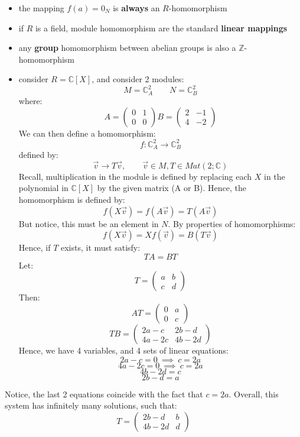 \documentclass{exam}
\begin{document}
\begin{itemize}
    \item the mapping $f(a) = 0_N$ is \textbf{always} an $R$-homomorphism
    \item if $R$ is a field, module homomorphism are the standard \textbf{linear mappings}
    \item any \textbf{group} homomorphism between abelian groups is also a  $\mathbb{Z}$-homomorphism
    \item consider $R = \mathbb{C}[X]$, and consider 2 modules:
    \[
    M = \mathbb{C}_A^2 \qquad N = \mathbb{C}_B^2
    \]
    where:
    \[
    A = \begin{pmatrix}
    0 & 1 \\
    0 & 0
    \end{pmatrix}
    B = \begin{pmatrix}
    2 & -1 \\
    4 & -2
    \end{pmatrix}
    \]
    We can then define a homomorphism:
    \[
    f : \mathbb{C}_A^2 \to \mathbb{C}_B^2
    \]
    defined by:
    \[
    \vec{v} \to T\vec{v}, \qquad \vec{v} \in M, T \in Mat(2;\mathbb{C})
    \]
    Recall, multiplication in the module is defined by replacing each $X$ in the polynomial in $\mathbb{C}[X]$ by the given matrix (A or B). Hence, the homomorphism is defined by:
    \[
    f(X\vec{v}) = f(A\vec{v}) = T(A\vec{v})
    \]
    But notice, this must be an element in $N$. By properties of homomorphisms:
    \[
    f(X \vec{v}) = Xf(\vec{v}) = B(T\vec{v})
    \]
    Hence, if $T$ exists, it must satisfy:
    \[
    TA = BT
    \]
    Let:
    \[
    T = \begin{pmatrix}
    a & b \\
    c & d
    \end{pmatrix}
    \]
    Then:
    \[
    AT = 
    \begin{pmatrix}
    0 & a \\
    0 & c
    \end{pmatrix}
    \]
    \[
    TB = 
    \begin{pmatrix}
    2a-c & 2b-d \\
    4a - 2c & 4b-2d
    \end{pmatrix}
    \]
    Hence, we have 4 variables, and 4 sets of linear equations:
    \[
    2a - c = 0 \ \implies \ c = 2a
    \]
    \[
    4a - 2c = 0 \ \implies \ c = 2a
    \]
    \[
    4b - 2d = c
    \]
    \[
    2b - d = a
    \]
\end{itemize}
Notice, the last 2 equations coincide with the fact that $c = 2a$. Overall, this system has infinitely many solutions, such that:
\[
T = \begin{pmatrix}
2b-d & b \\
4b - 2d & d
\end{pmatrix}
\]
\end{document}
